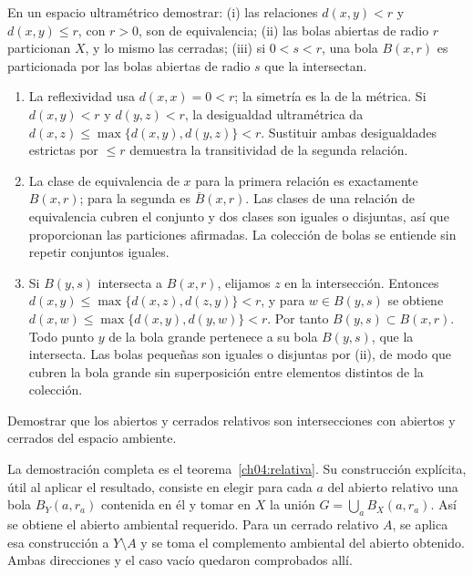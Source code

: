 \begin{ejercicio}\label{ej:lectura-3-9}
En un espacio ultramétrico demostrar: (i) las relaciones $d(x,y)<r$ y $d(x,y)\le r$, con $r>0$, son de equivalencia; (ii) las bolas abiertas de radio $r$ particionan $X$, y lo mismo las cerradas; (iii) si $0<s<r$, una bola $B(x,r)$ es particionada por las bolas abiertas de radio $s$ que la intersectan.
\end{ejercicio}
\begin{solucion}
\begin{enumerate}[label=(\roman*)]
\item La reflexividad usa $d(x,x)=0<r$; la simetría es la de la métrica. Si $d(x,y)<r$ y $d(y,z)<r$, la desigualdad ultramétrica da $d(x,z)\le\max\{d(x,y),d(y,z)\}<r$. Sustituir ambas desigualdades estrictas por $\le r$ demuestra la transitividad de la segunda relación.
\item La clase de equivalencia de $x$ para la primera relación es exactamente $B(x,r)$; para la segunda es $\overline B(x,r)$. Las clases de una relación de equivalencia cubren el conjunto y dos clases son iguales o disjuntas, así que proporcionan las particiones afirmadas. La colección de bolas se entiende sin repetir conjuntos iguales.
\item Si $B(y,s)$ intersecta a $B(x,r)$, elijamos $z$ en la intersección. Entonces $d(x,y)\le\max\{d(x,z),d(z,y)\}<r$, y para $w\in B(y,s)$ se obtiene $d(x,w)\le\max\{d(x,y),d(y,w)\}<r$. Por tanto $B(y,s)\subset B(x,r)$. Todo punto $y$ de la bola grande pertenece a su bola $B(y,s)$, que la intersecta. Las bolas pequeñas son iguales o disjuntas por (ii), de modo que cubren la bola grande sin superposición entre elementos distintos de la colección.
\end{enumerate}
\end{solucion}

\begin{ejercicio}\label{ej:lectura-4-1}
Demostrar que los abiertos y cerrados relativos son intersecciones con abiertos y cerrados del espacio ambiente.
\end{ejercicio}
\begin{solucion}
La demostración completa es el teorema~\ref{ch04:relativa}. Su construcción explícita, útil al aplicar el resultado, consiste en elegir para cada $a$ del abierto relativo una bola $B_Y(a,r_a)$ contenida en él y tomar en $X$ la unión $G=\bigcup_aB_X(a,r_a)$. Así se obtiene el abierto ambiental requerido. Para un cerrado relativo $A$, se aplica esa construcción a $Y\setminus A$ y se toma el complemento ambiental del abierto obtenido. Ambas direcciones y el caso vacío quedaron comprobados allí.
\end{solucion}

